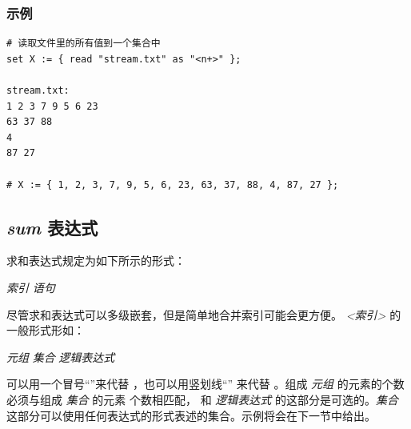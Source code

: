 \subsubsection{示例}%
{\small
\begin{verbatim}
# 读取文件里的所有值到一个集合中
set X := { read "stream.txt" as "<n+>" };

stream.txt:
1 2 3 7 9 5 6 23
63 37 88
4
87 27

# X := { 1, 2, 3, 7, 9, 5, 6, 23, 63, 37, 88, 4, 87, 27 };
\end{verbatim}
% 
% 
}

\subsection{\emph{sum} 表达式}
求和表达式规定为如下所示的形式：

\smallskip
{} \emph{索引}  \emph{语句}

\smallskip
\noindent 尽管求和表达式可以多级嵌套，但是简单地合并索引可能会更方便。
\emph{<索引>} 的一般形式形如：

\smallskip
\emph{元组}  \emph{集合}  \emph{逻辑表达式}

\smallskip
\noindent 可以用一个冒号“\code{:}”来代替 ，也可以用竖划线“\code{|}”
来代替 。组成 \emph{元组} 的元素的个数必须与组成 \emph{集合} 的元素
个数相匹配， 和 \emph{逻辑表达式} 的这部分是可选的。\emph{集合}
这部分可以使用任何表达式的形式表述的集合。示例将会在下一节中给出。


